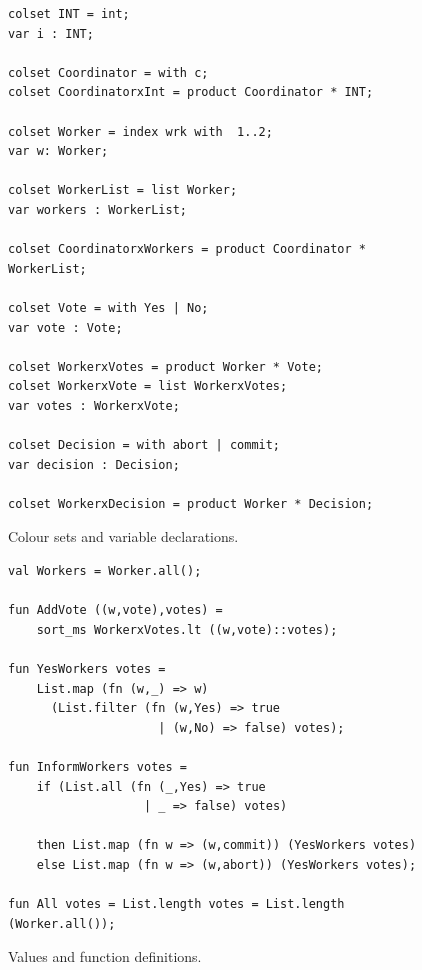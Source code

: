 \begin{figure}
\begin{verbatim}
colset INT = int;
var i : INT;

colset Coordinator = with c;
colset CoordinatorxInt = product Coordinator * INT;

colset Worker = index wrk with  1..2;
var w: Worker;

colset WorkerList = list Worker;
var workers : WorkerList;

colset CoordinatorxWorkers = product Coordinator * WorkerList;

colset Vote = with Yes | No;
var vote : Vote;

colset WorkerxVotes = product Worker * Vote;
colset WorkerxVote = list WorkerxVotes;
var votes : WorkerxVote;

colset Decision = with abort | commit;
var decision : Decision;

colset WorkerxDecision = product Worker * Decision;
\end{verbatim}
\caption{Colour sets and variable declarations.}
\end{figure}

\begin{figure}
\begin{verbatim}
val Workers = Worker.all();

fun AddVote ((w,vote),votes) = 
    sort_ms WorkerxVotes.lt ((w,vote)::votes);

fun YesWorkers votes = 
    List.map (fn (w,_) => w) 
      (List.filter (fn (w,Yes) => true 
                     | (w,No) => false) votes);

fun InformWorkers votes = 
    if (List.all (fn (_,Yes) => true 
                   | _ => false) votes)
                                            
    then List.map (fn w => (w,commit)) (YesWorkers votes)
    else List.map (fn w => (w,abort)) (YesWorkers votes);

fun All votes = List.length votes = List.length (Worker.all());
\end{verbatim}
\caption{Values and function definitions.}
\end{figure}
